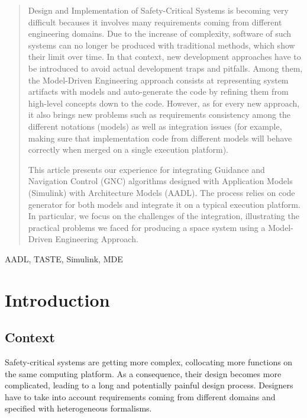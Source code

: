 \documentclass[10pt, conference, compsocconf]{IEEEtran}
\begin{document}
\begin{abstract}
Design and Implementation of Safety-Critical Systems is becoming very difficult
becauses it involves many requirements coming from different engineering domains. Due
to the increase of complexity, software of such systems can no longer be produced
with traditional methods, which show their limit over time. In that context,
new development approaches have to be introduced to 
avoid actual development traps and pitfalls. Among them,
the Model-Driven Engineering approach consists at representing
system artifacts with models and auto-generate the code by refining
them from high-level concepts down to the code. However, as for every
new approach, it also brings new problems such as requirements consistency
among the different notations (models) as well as integration
issues (for example, making sure that implementation code 
from different models will behave correctly when merged on a single execution
platform).

This article presents our experience for integrating Guidance
and Navigation Control (GNC) algorithms designed with Application Models
(Simulink) with Architecture Models (AADL). The process
relies on code generator for both models and integrate it on a typical execution
platform.
In particular, we focus on the challenges of the integration, illustrating
the practical problems we faced for producing a space system
using a Model-Driven Engineering Approach.

\end{abstract}

\begin{IEEEkeywords}
AADL, TASTE, Simulink, MDE
\end{IEEEkeywords}


%
\IEEEpeerreviewmaketitle



\section{Introduction}

\subsection{Context}
Safety-critical systems are getting more complex, collocating more
functions on the same computing platform. As a consequence, their design
becomes more complicated, leading to a long and potentially painful
design process. Designers have to take into account requirements
coming from different domains and specified with heterogeneous formalisms.
\end{document}
